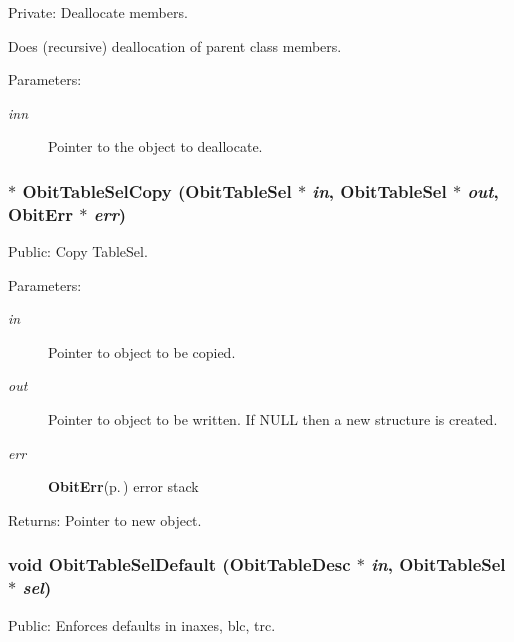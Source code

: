 Private: Deallocate members. 

Does (recursive) deallocation of parent class members. \begin{Desc}
\item[Parameters:]
\begin{description}
\item[{\em inn}]Pointer to the object to deallocate. \end{description}
\end{Desc}
\subsubsection{$\ast$ Obit\-Table\-Sel\-Copy ({\bf Obit\-Table\-Sel} $\ast$ {\em in}, {\bf Obit\-Table\-Sel} $\ast$ {\em out}, {\bf Obit\-Err} $\ast$ {\em err})}\label{ObitTableSel_8c_a8}


Public: Copy Table\-Sel. 

\begin{Desc}
\item[Parameters:]
\begin{description}
\item[{\em in}]Pointer to object to be copied. \item[{\em out}]Pointer to object to be written. If NULL then a new structure is created. \item[{\em err}]{\bf Obit\-Err}{\rm (p.\,\pageref{structObitErr})} error stack \end{description}
\end{Desc}
\begin{Desc}
\item[Returns:]Pointer to new object. \end{Desc}
\subsubsection{\setlength{\rightskip}{0pt plus 5cm}void Obit\-Table\-Sel\-Default ({\bf Obit\-Table\-Desc} $\ast$ {\em in}, {\bf Obit\-Table\-Sel} $\ast$ {\em sel})}\label{ObitTableSel_8c_a10}


Public: Enforces defaults in inaxes, blc, trc. 

